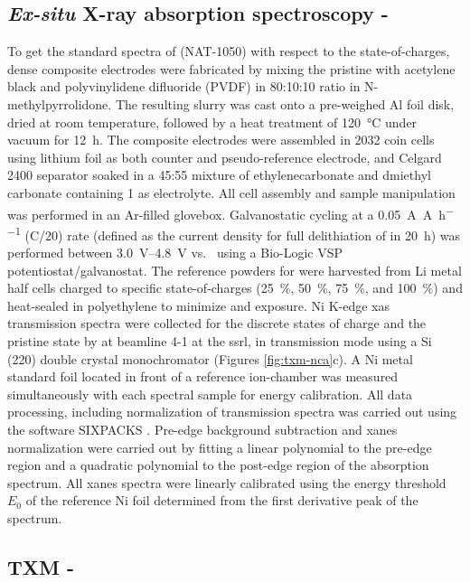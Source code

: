 \documentclass{article}
\begin{document}
\subsection*{\textit{Ex-situ} X-ray absorption spectroscopy - \nca{}}
To get the standard spectra of \nca{} (NAT-1050) with respect to the
state-of-charges, dense composite electrodes were fabricated by mixing
the pristine \nca{} with acetylene black and polyvinylidene difluoride
(PVDF) in 80:10:10 ratio in N-methylpyrrolidone. The resulting slurry
was cast onto a pre-weighed Al foil disk, dried at room temperature,
followed by a heat treatment of \SI{120}{\celsius} under vacuum for
\SI{12}{\hour}. The composite electrodes were assembled in 2032 coin
cells using lithium foil as both counter and pseudo-reference
electrode, and Celgard 2400 separator soaked in a 45:55 mixture of
ethylenecarbonate and dmiethyl carbonate containing \SI{1}{\molar}
 as electrolyte. All cell assembly and sample manipulation
was performed in an Ar-filled glovebox. Galvanostatic cycling at a
\SI{0.05}{\ampere\per\ampere\per\hour} (C/20) rate (defined as the current
density for full delithiation of \nca{} in \SI{20}{\hour}) was
performed between \SIrange{3.0}{4.8}{\volt} vs.\  using a
Bio-Logic VSP potentiostat/galvanostat. The reference powders for
\nca{} were harvested from Li metal half cells charged to specific
state-of-charges (\SI{25}{\percent}, \SI{50}{\percent},
\SI{75}{\percent}, and \SI{100}{\percent}) and heat-sealed in
polyethylene to minimize  and  exposure. Ni K-edge
\gls{xas} transmission spectra were collected for the discrete states
of charge and the pristine state by at beamline 4-1 at the \gls{ssrl},
in transmission mode using a Si (220) double crystal monochromator
(Figures \ref{fig:txm-nca}c). A Ni metal standard foil located in
front of a reference ion-chamber was measured simultaneously with each
spectral sample for energy calibration. All data processing, including
normalization of transmission spectra was carried out using the
software {SIXPACKS} \cite{lai2011}. Pre-edge background subtraction
and \gls{xanes} normalization were carried out by fitting a linear
polynomial to the pre-edge region and a quadratic polynomial to the
post-edge region of the absorption spectrum. All \gls{xanes} spectra
were linearly calibrated using the energy threshold $E_0$ of the
reference Ni foil determined from the first derivative peak of the
spectrum.


\subsection*{TXM - \nca{}}
\end{document}
